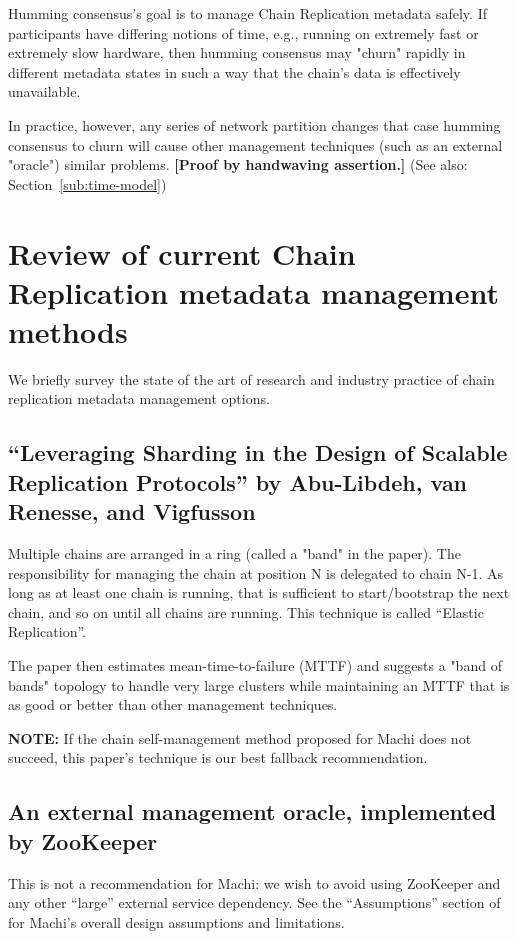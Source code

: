 \documentclass[preprint,10pt]{sigplanconf}
\begin{document}
Humming consensus's goal is to manage Chain Replication metadata
safely.  If participants have differing notions of time, e.g., running
on extremely fast or extremely slow hardware, then humming consensus
may "churn" rapidly in different metadata states in such a way that
the chain's data is effectively unavailable.  

In practice, however, any series of network partition changes that
case humming consensus to churn will cause other management techniques
(such as an external "oracle") similar problems.
{\bf [Proof by handwaving assertion.]}
(See also: Section~\ref{sub:time-model})

\section{Review of current Chain Replication metadata management methods}
\label{sec:cr-management-review}

We briefly survey the state of the art of research and industry
practice of chain replication metadata management options.

\subsection{``Leveraging Sharding in the Design of Scalable Replication Protocols'' by Abu-Libdeh, van Renesse, and Vigfusson}
\label{ssec:elastic-replication}
Multiple chains are arranged in a ring (called a "band" in the paper).
The responsibility for managing the chain at position N is delegated
to chain N-1.  As long as at least one chain is running, that is
sufficient to start/bootstrap the next chain, and so on until all
chains are running.  This technique is called ``Elastic Replication''.

The paper then estimates mean-time-to-failure
(MTTF) and suggests a "band of bands" topology to handle very large
clusters while maintaining an MTTF that is as good or better than
other management techniques.

{\bf NOTE:} If the chain self-management method proposed for Machi does not
succeed, this paper's technique is our best fallback recommendation.

\subsection{An external management oracle, implemented by ZooKeeper}
\label{ssec:an-oracle}
This is not a recommendation for Machi: we wish to avoid using
ZooKeeper and any other ``large'' external service dependency.  See
the ``Assumptions'' section of \cite{machi-design} for Machi's overall
design assumptions and limitations.
\end{document}
